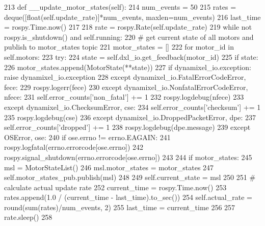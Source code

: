 \begin{DoxyCode}
213     \textcolor{keyword}{def }\_\_update\_motor\_states(self):
214         num\_events = 50
215         rates = deque([float(self.update\_rate)]*num\_events, maxlen=num\_events)
216         last\_time = rospy.Time.now()
217         
218         rate = rospy.Rate(self.update\_rate)
219         \textcolor{keywordflow}{while} \textcolor{keywordflow}{not} rospy.is\_shutdown() \textcolor{keywordflow}{and} self.running:
220             \textcolor{comment}{# get current state of all motors and publish to motor\_states topic}
221             motor\_states = []
222             \textcolor{keywordflow}{for} motor\_id \textcolor{keywordflow}{in} self.motors:
223                 \textcolor{keywordflow}{try}:
224                     state = self.dxl\_io.get\_feedback(motor\_id)
225                     \textcolor{keywordflow}{if} state:
226                         motor\_states.append(MotorState(**state))
227                         \textcolor{keywordflow}{if} dynamixel\_io.exception: \textcolor{keywordflow}{raise} dynamixel\_io.exception
228                 \textcolor{keywordflow}{except} dynamixel\_io.FatalErrorCodeError, fece:
229                     rospy.logerr(fece)
230                 \textcolor{keywordflow}{except} dynamixel\_io.NonfatalErrorCodeError, nfece:
231                     self.error\_counts[\textcolor{stringliteral}{'non\_fatal'}] += 1
232                     rospy.logdebug(nfece)
233                 \textcolor{keywordflow}{except} dynamixel\_io.ChecksumError, cse:
234                     self.error\_counts[\textcolor{stringliteral}{'checksum'}] += 1
235                     rospy.logdebug(cse)
236                 \textcolor{keywordflow}{except} dynamixel\_io.DroppedPacketError, dpe:
237                     self.error\_counts[\textcolor{stringliteral}{'dropped'}] += 1
238                     rospy.logdebug(dpe.message)
239                 \textcolor{keywordflow}{except} OSError, ose:
240                     \textcolor{keywordflow}{if} ose.errno != errno.EAGAIN:
241                         rospy.logfatal(errno.errorcode[ose.errno])
242                         rospy.signal\_shutdown(errno.errorcode[ose.errno])
243                         
244             \textcolor{keywordflow}{if} motor\_states:
245                 msl = MotorStateList()
246                 msl.motor\_states = motor\_states
247                 self.motor\_states\_pub.publish(msl)
248                 
249                 self.current\_state = msl
250                 
251                 \textcolor{comment}{# calculate actual update rate}
252                 current\_time = rospy.Time.now()
253                 rates.append(1.0 / (current\_time - last\_time).to\_sec())
254                 self.actual\_rate = round(sum(rates)/num\_events, 2)
255                 last\_time = current\_time
256                 
257             rate.sleep()
258 
\end{DoxyCode}
